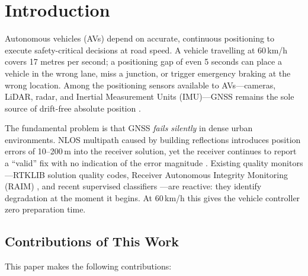 \documentclass[12pt,a4paper]{article}
\begin{document}
\section{Introduction}
\label{sec:intro}

Autonomous vehicles (AVs) depend on accurate, continuous positioning to execute safety-critical
decisions at road speed.
A vehicle travelling at 60\,km/h covers 17 metres per second; a positioning gap of even
5 seconds can place a vehicle in the wrong lane, miss a junction, or trigger emergency braking
at the wrong location.
Among the positioning sensors available to AVs—cameras, LiDAR, radar, and Inertial Measurement
Units (IMU)—GNSS remains the sole source of drift-free absolute position \cite{groves2013gnss}.

The fundamental problem is that GNSS \emph{fails silently} in dense urban environments.
NLOS multipath caused by building reflections introduces position errors of 10--200\,m into
the receiver solution, yet the receiver continues to report a ``valid'' fix with no indication
of the error magnitude \cite{zhu2018gnss}.
Existing quality monitors—RTKLIB solution quality codes, Receiver Autonomous Integrity
Monitoring (RAIM) \cite{brown1997raim}, and recent supervised classifiers \cite{liu2023gnss,hsu2018nlos}—are
reactive: they identify degradation at the moment it begins.
At 60\,km/h this gives the vehicle controller zero preparation time.

\subsection{Contributions of This Work}

This paper makes the following contributions:
\end{document}
